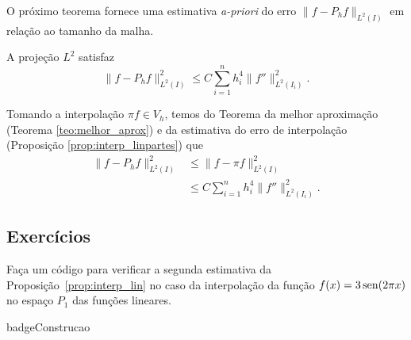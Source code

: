 O próximo teorema fornece uma estimativa \textit{a-priori} do erro $\|f-P_h f\|_{L^2(I)}$ em relação ao tamanho da malha.

\begin{teo}\label{teo:erro_proj_1d}
  A projeção $L^2$ satisfaz
  \begin{equation}
    \|f-P_hf\|_{L^2(I)}^2 \leq C\sum_{i=1}^n h_i^4\|f''\|_{L^2(I_i)}^2.
  \end{equation}
\end{teo}
\begin{dem}
  Tomando a interpolação $\pi f \in V_h$, temos do Teorema da melhor aproximação (Teorema \ref{teo:melhor_aprox}) e da estimativa do erro de interpolação (Proposição \ref{prop:interp_linpartes}) que
  \begin{align}
    \|f - P_hf\|_{L^2(I)}^2 &\leq \|f-\pi f\|_{L^2(I)}^2\\
    &\leq C\sum_{i=1}^n h_i^4\|f''\|_{L^2(I_i)}^2.
  \end{align}
\end{dem}



% 

\subsection{Exercícios}
\badgeRevisar

\begin{exer}
  Faça um código para verificar a segunda estimativa da Proposição~\ref{prop:interp_lin} no caso da interpolação da função $f(x) = 3\operatorname{sen}(2\pi x)$ no espaço $P_1$ das funções lineares.
\end{exer}
\begin{resp}
  badgeConstrucao
\end{resp}


